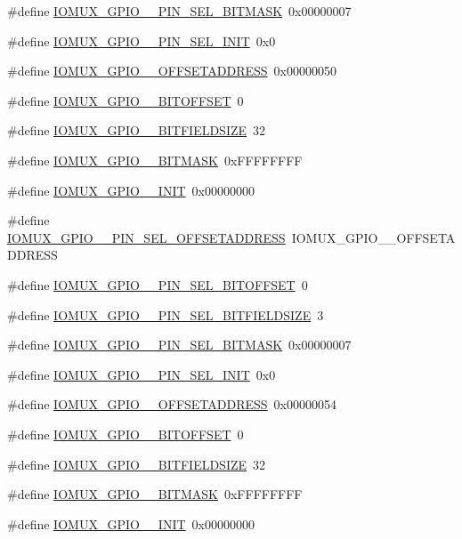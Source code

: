 \begin{DoxyCompactItemize}
\item 
\#define \hyperlink{a00560_a2a05f8d964ae49468ee5f89303e3b12e}{IOMUX\_\-GPIO\_\_\-PIN\_\-SEL\_\-BITMASK}~0x00000007
\item 
\#define \hyperlink{a00560_ad1965b32848e9e7dcc80300042996c0a}{IOMUX\_\-GPIO\_\_\-PIN\_\-SEL\_\-INIT}~0x0
\item 
\#define \hyperlink{a00560_a02e3dbaf8c7be710aeb37d86b94aab42}{IOMUX\_\-GPIO\_\_\-OFFSETADDRESS}~0x00000050
\item 
\#define \hyperlink{a00560_a92b011ea3b0af7ef38d59776a98c2957}{IOMUX\_\-GPIO\_\_\-BITOFFSET}~0
\item 
\#define \hyperlink{a00560_a32e7bb7604804e3db41f5d7077c2294c}{IOMUX\_\-GPIO\_\_\-BITFIELDSIZE}~32
\item 
\#define \hyperlink{a00560_aee11c012a8992929e4cf96ca19703d4f}{IOMUX\_\-GPIO\_\_\-BITMASK}~0xFFFFFFFF
\item 
\#define \hyperlink{a00560_a89014ee718d4df7f716e622438776395}{IOMUX\_\-GPIO\_\_\-INIT}~0x00000000
\item 
\#define \hyperlink{a00560_a029c691ad8606e39ec3b7394e4acdd8c}{IOMUX\_\-GPIO\_\_\-PIN\_\-SEL\_\-OFFSETADDRESS}~IOMUX\_\-GPIO\_\_\-OFFSETADDRESS
\item 
\#define \hyperlink{a00560_ae780ae552c3f031dd0dfa4389b52ab55}{IOMUX\_\-GPIO\_\_\-PIN\_\-SEL\_\-BITOFFSET}~0
\item 
\#define \hyperlink{a00560_ae7c607a3a051caa89293df06eba42d28}{IOMUX\_\-GPIO\_\_\-PIN\_\-SEL\_\-BITFIELDSIZE}~3
\item 
\#define \hyperlink{a00560_a588a721a44bc465fdf7869d9ff103fda}{IOMUX\_\-GPIO\_\_\-PIN\_\-SEL\_\-BITMASK}~0x00000007
\item 
\#define \hyperlink{a00560_ac0bd55f27208e3463ca35fee734862bd}{IOMUX\_\-GPIO\_\_\-PIN\_\-SEL\_\-INIT}~0x0
\item 
\#define \hyperlink{a00560_a2a52f528783478d667ef9151248f26ae}{IOMUX\_\-GPIO\_\_\-OFFSETADDRESS}~0x00000054
\item 
\#define \hyperlink{a00560_a5431cd18924ca714cd493bfd4683c1c7}{IOMUX\_\-GPIO\_\_\-BITOFFSET}~0
\item 
\#define \hyperlink{a00560_a45f1906724407bef9252093b90f3b396}{IOMUX\_\-GPIO\_\_\-BITFIELDSIZE}~32
\item 
\#define \hyperlink{a00560_a8d6c71b320074a84faae7617177a9e18}{IOMUX\_\-GPIO\_\_\-BITMASK}~0xFFFFFFFF
\item 
\#define \hyperlink{a00560_a37c6534803fbefaae3655832e41ebc42}{IOMUX\_\-GPIO\_\_\-INIT}~0x00000000

\end{DoxyCompactItemize}

